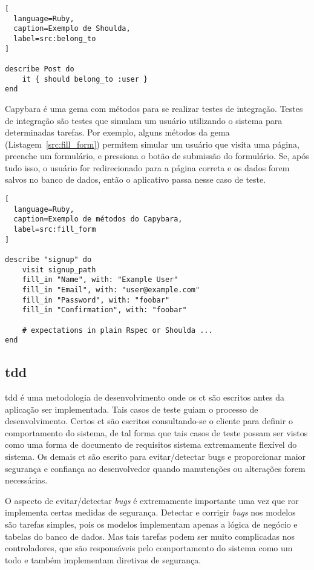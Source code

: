\begin{lstlisting}[
  language=Ruby,
  caption=Exemplo de Shoulda,
  label=src:belong_to
]

describe Post do
	it { should belong_to :user }
end

\end{lstlisting}

Capybara é uma gema com métodos para se realizar testes de integração. Testes de integração são testes que simulam um usuário utilizando o sistema para
determinadas tarefas. Por exemplo, alguns métodos da gema (Listagem~\ref{src:fill_form}) permitem simular um usuário que visita uma página,
preenche um formulário, e pressiona o botão de submissão do formulário. Se, após tudo isso, o usuário for redirecionado para a página correta e os dados
forem salvos no banco de dados, então o aplicativo passa nesse caso de teste.

\begin{lstlisting}[
  language=Ruby,
  caption=Exemplo de métodos do Capybara,
  label=src:fill_form
]

describe "signup" do
	visit signup_path
	fill_in "Name", with: "Example User"
	fill_in "Email", with: "user@example.com"
	fill_in "Password", with: "foobar"
	fill_in "Confirmation", with: "foobar"
	
	# expectations in plain Rspec or Shoulda ...
end

\end{lstlisting}

\subsection{\gls{tdd}}

\gls{tdd} é uma metodologia de desenvolvimento onde os \gls{ct} são escritos antes da aplicação ser implementada. Tais casos de teste guiam
o processo de desenvolvimento. Certos \gls{ct} são escritos consultando-se o cliente para definir o comportamento do sistema, de tal forma que 
tais casos de teste possam ser vistos como uma forma de documento de requisitos sistema extremamente flexível do sistema. Os demais \gls{ct}
são escrito para evitar/detectar \gls{bugs} e proporcionar maior segurança e confiança ao desenvolvedor quando manutenções ou alterações forem necessárias.

O aspecto de evitar/detectar \textit{bugs} é extremamente importante uma vez que \gls{ror} implementa certas medidas de segurança. Detectar e 
corrigir \textit{bugs} nos modelos são tarefas simples, pois os modelos implementam apenas a lógica de negócio e tabelas do banco de dados. Mas tais tarefas
podem ser muito complicadas nos controladores, que são responsáveis pelo comportamento do sistema como um todo e também implementam diretivas de segurança.

